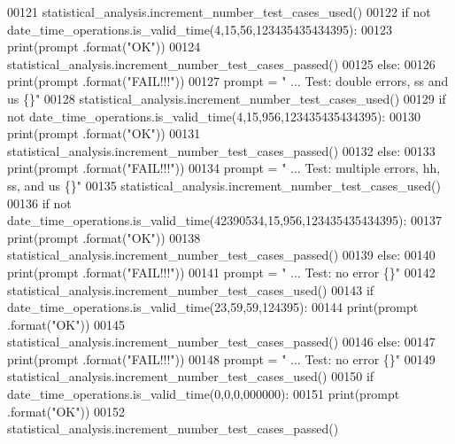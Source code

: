 \begin{DoxyCode}
00121         statistical\_analysis.increment\_number\_test\_cases\_used()
00122         \textcolor{keywordflow}{if} \textcolor{keywordflow}{not} date\_time\_operations.is\_valid\_time(4,15,56,123435435434395):
00123             print(prompt .format(\textcolor{stringliteral}{"OK"}))
00124             statistical\_analysis.increment\_number\_test\_cases\_passed()
00125         \textcolor{keywordflow}{else}:
00126             print(prompt .format(\textcolor{stringliteral}{"FAIL!!!"}))
00127         prompt = \textcolor{stringliteral}{"  ... Test: double errors, ss and us          \{\}"}
00128         statistical\_analysis.increment\_number\_test\_cases\_used()
00129         \textcolor{keywordflow}{if} \textcolor{keywordflow}{not} date\_time\_operations.is\_valid\_time(4,15,956,123435435434395):
00130             print(prompt .format(\textcolor{stringliteral}{"OK"}))
00131             statistical\_analysis.increment\_number\_test\_cases\_passed()
00132         \textcolor{keywordflow}{else}:
00133             print(prompt .format(\textcolor{stringliteral}{"FAIL!!!"}))
00134         prompt = \textcolor{stringliteral}{"  ... Test: multiple errors, hh, ss, and us       \{\}"}
00135         statistical\_analysis.increment\_number\_test\_cases\_used()
00136         \textcolor{keywordflow}{if} \textcolor{keywordflow}{not} date\_time\_operations.is\_valid\_time(42390534,15,956,123435435434395):
00137             print(prompt .format(\textcolor{stringliteral}{"OK"}))
00138             statistical\_analysis.increment\_number\_test\_cases\_passed()
00139         \textcolor{keywordflow}{else}:
00140             print(prompt .format(\textcolor{stringliteral}{"FAIL!!!"}))
00141         prompt = \textcolor{stringliteral}{"  ... Test: no error                  \{\}"}
00142         statistical\_analysis.increment\_number\_test\_cases\_used()
00143         \textcolor{keywordflow}{if} date\_time\_operations.is\_valid\_time(23,59,59,124395):
00144             print(prompt .format(\textcolor{stringliteral}{"OK"}))
00145             statistical\_analysis.increment\_number\_test\_cases\_passed()
00146         \textcolor{keywordflow}{else}:
00147             print(prompt .format(\textcolor{stringliteral}{"FAIL!!!"}))
00148         prompt = \textcolor{stringliteral}{"  ... Test: no error                  \{\}"}
00149         statistical\_analysis.increment\_number\_test\_cases\_used()
00150         \textcolor{keywordflow}{if} date\_time\_operations.is\_valid\_time(0,0,0,000000):
00151             print(prompt .format(\textcolor{stringliteral}{"OK"}))
00152             statistical\_analysis.increment\_number\_test\_cases\_passed()

\end{DoxyCode}
